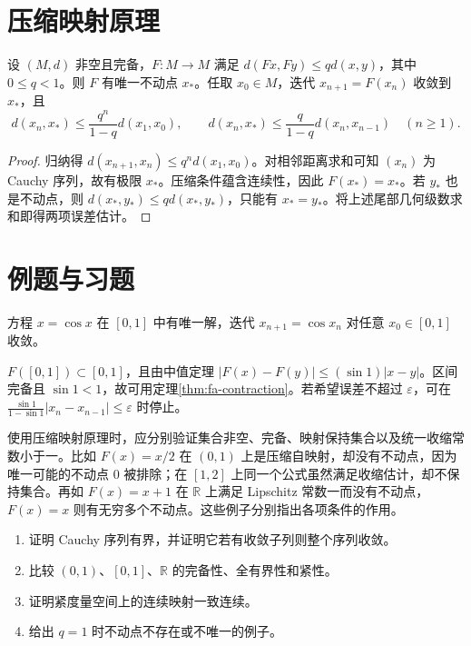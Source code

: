 \documentclass[UTF8,12pt,a4paper,fontset=fandol]{ctexbook}
\begin{document}
\section{压缩映射原理}
\begin{theorem}\label{thm:fa-contraction}
设 $(M,d)$ 非空且完备，$F:M\to M$ 满足 $d(Fx,Fy)\leq qd(x,y)$，其中 $0\leq q<1$。则 $F$ 有唯一不动点 $x_*$。任取 $x_0\in M$，迭代 $x_{n+1}=F(x_n)$ 收敛到 $x_*$，且
\[
 d(x_n,x_*)\leq\frac{q^n}{1-q}d(x_1,x_0),\qquad
 d(x_n,x_*)\leq\frac{q}{1-q}d(x_n,x_{n-1})\quad(n\geq1).
\]
\end{theorem}
\begin{proof}
归纳得 $d(x_{n+1},x_n)\leq q^nd(x_1,x_0)$。对相邻距离求和可知 $(x_n)$ 为 Cauchy 序列，故有极限 $x_*$。压缩条件蕴含连续性，因此 $F(x_*)=x_*$。若 $y_*$ 也是不动点，则 $d(x_*,y_*)\leq qd(x_*,y_*)$，只能有 $x_*=y_*$。将上述尾部几何级数求和即得两项误差估计。
\end{proof}

\section{例题与习题}
\begin{example}
方程 $x=\cos x$ 在 $[0,1]$ 中有唯一解，迭代 $x_{n+1}=\cos x_n$ 对任意 $x_0\in[0,1]$ 收敛。
\end{example}
\begin{solve}
$F([0,1])\subset[0,1]$，且由中值定理 $|F(x)-F(y)|\leq(\sin1)|x-y|$。区间完备且 $\sin1<1$，故可用定理\ref{thm:fa-contraction}。若希望误差不超过 $\varepsilon$，可在 $\frac{\sin1}{1-\sin1}|x_n-x_{n-1}|\leq\varepsilon$ 时停止。
\end{solve}

使用压缩映射原理时，应分别验证集合非空、完备、映射保持集合以及统一收缩常数小于一。比如 $F(x)=x/2$ 在 $(0,1)$ 上是压缩自映射，却没有不动点，因为唯一可能的不动点 $0$ 被排除；在 $[1,2]$ 上同一个公式虽然满足收缩估计，却不保持集合。再如 $F(x)=x+1$ 在 $\mathbb R$ 上满足 Lipschitz 常数一而没有不动点，$F(x)=x$ 则有无穷多个不动点。这些例子分别指出各项条件的作用。
\begin{enumerate}
 \item\label{exer:fa-cauchy} 证明 Cauchy 序列有界，并证明它若有收敛子列则整个序列收敛。
 \item 比较 $(0,1)$、$[0,1]$、$\mathbb R$ 的完备性、全有界性和紧性。
 \item 证明紧度量空间上的连续映射一致连续。
 \item 给出 $q=1$ 时不动点不存在或不唯一的例子。
\end{enumerate}
\end{document}

